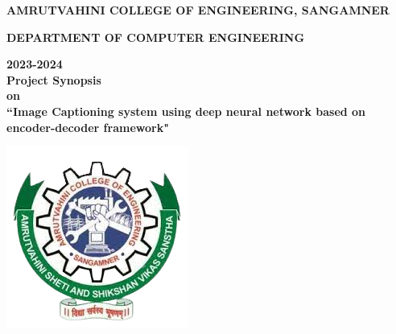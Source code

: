 \documentclass[12pt]{report}	%
\begin{document}




 \begin{center}
{\large \bf{  AMRUTVAHINI COLLEGE OF ENGINEERING, SANGAMNER}}\\ 
		\begin{small}
		{ \bf DEPARTMENT OF COMPUTER ENGINEERING}\\ 
		\end{small}
		\small{\bf{2023-2024}}\\
        {\large \bf {Project Synopsis  }} \\
        {\large \bf {on  }} \\
        
\large {\bf ``Image Captioning system using deep neural network based on encoder-decoder framework"}
       \end{center}
       \begin{center}
\includegraphics[scale=0.42]{AVCOE_LOGO.png} 
\end{center}
\end{document}
